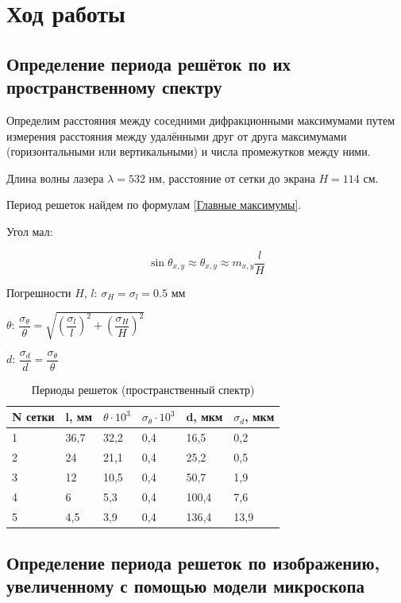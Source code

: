 \documentclass[a4paper, 12pt]{article}
\begin{document}
\section*{Ход работы}

\subsection*{Определение периода решёток по их пространственному спектру}

Определим расстояния между соседними дифракционными максимумами путем измерения расстояния между удалёнными друг от друга максимумами (горизонтальными или вертикальными) и числа промежутков между ними.

Длина волны лазера $\lambda = 532$ нм, расстояние от сетки до экрана $H = 114$ см. 

Период решеток найдем по формулам \eqref{Главные максимумы}.

Угол мал:

\[\sin\theta_{x,y}\approx \theta_{x,y}\approx m_{x,y}\dfrac{l}{H}\]

Погрешности $H$, $l$: $\sigma_H = \sigma_l = 0.5$ мм

$\theta$: $\dfrac{\sigma_{\theta}}{\theta} = \sqrt{\left(\dfrac{\sigma_l}{l}\right)^2 + \left(\dfrac{\sigma_H}{H}\right)^2}$


$d$: $\dfrac{\sigma_d}{d} = \dfrac{\sigma_{\theta}}{\theta}$

\begin{table}[h!] \label{Tab1}
\centering
\begin{tabular}{|l|l|l|l|l|l|}
\hline
N сетки & l, мм & $\theta \cdot 10^3$ & $\sigma_{\theta} \cdot 10^3$ & d, мкм & $\sigma_d$, мкм \\ \hline
1       & 36,7  & 32,2                    & 0,4 & 16,5   & 0,2 \\ \hline
2       & 24    & 21,1                    & 0,4 & 25,2   & 0,5 \\ \hline
3       & 12    & 10,5                    & 0,4 & 50,7   & 1,9 \\ \hline
4       & 6     & 5,3                     & 0,4 & 100,4  & 7,6 \\ \hline
5       & 4,5   & 3,9                     & 0,4 & 136,4  & 13,9 \\ \hline
\end{tabular}
\caption{Периоды решеток (пространственный спектр)}
\end{table}

\subsection*{Определение периода решеток по изображению, увеличенному с помощью модели микроскопа}
\end{document}
